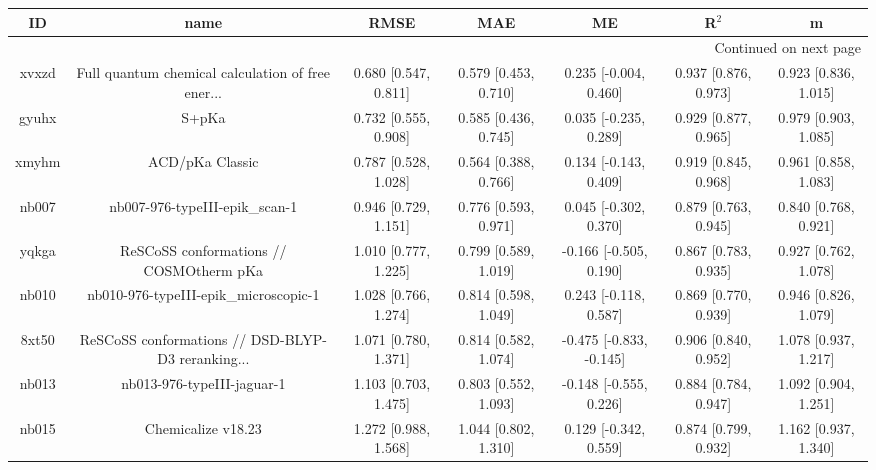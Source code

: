 \documentclass{article}
\begin{document}
\begin{center}
\begin{longtable}{|ccccccc|}
\toprule
    ID &                                               name &                  RMSE &                   MAE &                       ME &                 R$^2$ &                      m \\
\midrule
\endhead
\midrule
\multicolumn{7}{r}{{Continued on next page}} \\
\midrule
\endfoot

\bottomrule
\endlastfoot
 xvxzd &  Full quantum chemical calculation of free ener... &  0.680 [0.547, 0.811] &  0.579 [0.453, 0.710] &    0.235 [-0.004, 0.460] &  0.937 [0.876, 0.973] &   0.923 [0.836, 1.015] \\
 gyuhx &                                              S+pKa &  0.732 [0.555, 0.908] &  0.585 [0.436, 0.745] &    0.035 [-0.235, 0.289] &  0.929 [0.877, 0.965] &   0.979 [0.903, 1.085] \\
 xmyhm &                                    ACD/pKa Classic &  0.787 [0.528, 1.028] &  0.564 [0.388, 0.766] &    0.134 [-0.143, 0.409] &  0.919 [0.845, 0.968] &   0.961 [0.858, 1.083] \\
 nb007 &                     nb007-976-typeIII-epik\_scan-1 &  0.946 [0.729, 1.151] &  0.776 [0.593, 0.971] &    0.045 [-0.302, 0.370] &  0.879 [0.763, 0.945] &   0.840 [0.768, 0.921] \\
 yqkga &            ReSCoSS conformations // COSMOtherm pKa &  1.010 [0.777, 1.225] &  0.799 [0.589, 1.019] &   -0.166 [-0.505, 0.190] &  0.867 [0.783, 0.935] &   0.927 [0.762, 1.078] \\
 nb010 &              nb010-976-typeIII-epik\_microscopic-1 &  1.028 [0.766, 1.274] &  0.814 [0.598, 1.049] &    0.243 [-0.118, 0.587] &  0.869 [0.770, 0.939] &   0.946 [0.826, 1.079] \\
 8xt50 &  ReSCoSS conformations // DSD-BLYP-D3 reranking... &  1.071 [0.780, 1.371] &  0.814 [0.582, 1.074] &  -0.475 [-0.833, -0.145] &  0.906 [0.840, 0.952] &   1.078 [0.937, 1.217] \\
 nb013 &                         nb013-976-typeIII-jaguar-1 &  1.103 [0.703, 1.475] &  0.803 [0.552, 1.093] &   -0.148 [-0.555, 0.226] &  0.884 [0.784, 0.947] &   1.092 [0.904, 1.251] \\
 nb015 &                                 Chemicalize v18.23 &  1.272 [0.988, 1.568] &  1.044 [0.802, 1.310] &    0.129 [-0.342, 0.559] &  0.874 [0.799, 0.932] &   1.162 [0.937, 1.340] \\

\end{longtable}
\end{center}
\end{document}
